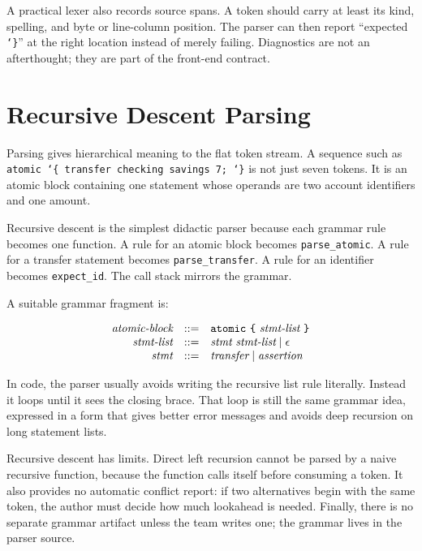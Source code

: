 A practical lexer also records source spans. A token should carry at least its kind, spelling, and byte or line-column position. The parser can then report ``expected \texttt{\char`\}}'' at the right location instead of merely failing. Diagnostics are not an afterthought; they are part of the front-end contract.

\section{Recursive Descent Parsing}

Parsing gives hierarchical meaning to the flat token stream. A sequence such as \texttt{atomic \char`\{ transfer checking savings 7; \char`\}} is not just seven tokens. It is an atomic block containing one statement whose operands are two account identifiers and one amount.

Recursive descent is the simplest didactic parser because each grammar rule becomes one function. A rule for an atomic block becomes \texttt{parse\_atomic}. A rule for a transfer statement becomes \texttt{parse\_transfer}. A rule for an identifier becomes \texttt{expect\_id}. The call stack mirrors the grammar.

A suitable grammar fragment is:

$$
\begin{array}{rcl}
\textit{atomic-block} & ::= & \texttt{atomic} \ \texttt{\char`\{} \ \textit{stmt-list} \ \texttt{\char`\}} \\
\textit{stmt-list} & ::= & \textit{stmt} \ \textit{stmt-list} \mid \epsilon \\
\textit{stmt} & ::= & \textit{transfer} \mid \textit{assertion}
\end{array}
$$

In code, the parser usually avoids writing the recursive list rule literally. Instead it loops until it sees the closing brace. That loop is still the same grammar idea, expressed in a form that gives better error messages and avoids deep recursion on long statement lists.

Recursive descent has limits. Direct left recursion cannot be parsed by a naive recursive function, because the function calls itself before consuming a token. It also provides no automatic conflict report: if two alternatives begin with the same token, the author must decide how much lookahead is needed. Finally, there is no separate grammar artifact unless the team writes one; the grammar lives in the parser source.

